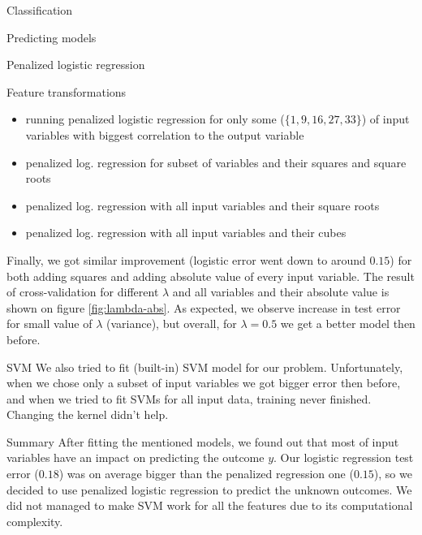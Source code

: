 \documentclass{article}
\begin{document}
\begin{section}{Classification}
\begin{subsection}{Predicting models}
\begin{subsubsection}{Penalized logistic regression}
\begin{subsubsection}{Feature transformations}
\begin{itemize}
\item running penalized logistic regression for only some ($\{1, 9, 16, 27, 33\}$) of input variables with biggest correlation to the output variable
\item penalized log. regression for subset of variables and their squares and square roots
\item penalized log. regression with all input variables and their square roots
\item penalized log. regression with all input variables and their cubes
\end{itemize}
Finally, we got similar improvement (logistic error went down to around $0.15$) for both adding squares and adding absolute value of every input variable. The result of cross-validation for different $\lambda$ and all variables and their absolute value is shown on figure \ref{fig:lambda-abs}. As expected, we observe increase in test error for small value of $\lambda$ (variance), but overall, for $\lambda = 0.5$ we get a better model then before.
\end{subsubsection}
\end{subsubsection}
\begin{subsubsection}{SVM}
We also tried to fit (built-in) SVM model for our problem. Unfortunately, when we chose only a subset of input variables we got bigger error then before, and when we tried to fit SVMs for all input data, training never finished. Changing the kernel didn't help.
\end{subsubsection}
\end{subsection}
\begin{subsection}{Summary}
After fitting the mentioned models, we found out that most of input variables have an impact on predicting the outcome $y$. Our logistic regression test error ($0.18$) was on average bigger than the penalized regression one ($0.15$), so we decided to use penalized logistic regression to predict the unknown outcomes. We did not managed to make SVM work for all the features due to its computational complexity.
\end{subsection}
\end{section}
\end{document}
